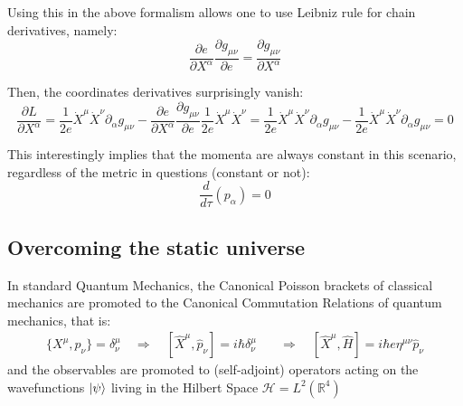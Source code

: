 \documentclass[a4paper,10pt]{article}
\numberwithin{equation}{section}
\begin{document}
Using this in the above formalism allows one to use Leibniz rule for chain derivatives, namely:
\begin{equation}
    \frac{\partial e}{\partial X^\alpha} \frac{\partial g_{\mu \nu}}{\partial e} = \frac{\partial g_{\mu \nu}}{\partial X^\alpha}
\end{equation}

Then, the coordinates derivatives surprisingly vanish:
\begin{equation}
    \frac{\partial L}{\partial X^\alpha } = \frac{1}{2e}\dot{X}^\mu \dot{X}^\nu \partial_\alpha g_{\mu \nu} - \frac{\partial e}{\partial X^\alpha } \frac{\partial g_{\mu \nu}}{\partial e}\frac{1}{2e}\dot{X}^\mu \dot{X}^\nu = \frac{1}{2e}\dot{X}^\mu \dot{X}^\nu \partial_\alpha g_{\mu \nu} - \frac{1}{2e}\dot{X}^\mu \dot{X}^\nu \partial_\alpha g_{\mu \nu} = 0
\end{equation}

This interestingly implies that the momenta are always constant in this scenario, regardless of the metric in questions (constant or not):
\begin{equation}
    \frac{d}{d\tau}(p_\alpha) = 0
    \label{alwaysconstantmomenta}
\end{equation}
\fi



\subsection{Overcoming the static universe}
In standard Quantum Mechanics, the Canonical Poisson brackets of classical mechanics are promoted to the Canonical Commutation Relations of quantum mechanics, that is:
\begin{eqnarray}
    \{X^\mu, p_\nu\} = \delta^\mu_\nu \quad  \Rightarrow   \quad  \left[ \hat{X}^{\mu}, \hat{p}_{\nu} \right] = i\hbar \delta^\mu_\nu \quad & \Rightarrow \quad \left[ \hat{X}^\mu, \hat{H} \right] = i\hbar e \eta^{\mu\nu} \hat{p}_\nu
\end{eqnarray}
and the observables are promoted to (self-adjoint) operators acting on the wavefunctions $\ket{\psi}$ living in the Hilbert Space $\mathcal{H}= L^2(\mathbb{R}^4)$
\end{document}

